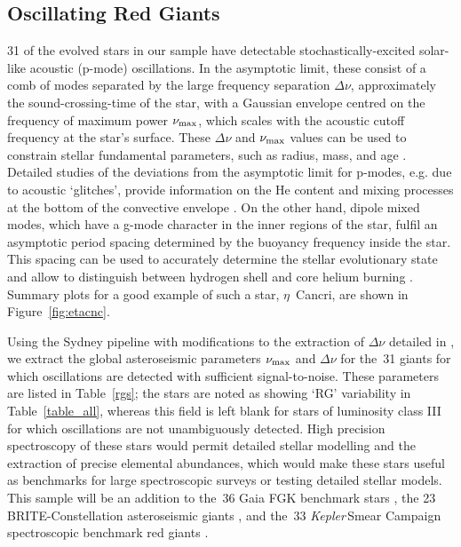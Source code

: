 \documentclass[modern]{aastex62}
\newcommand{\numax}{\mbox{$\nu_{\rm max}$}\xspace}
\newcommand{\Dnu}{\mbox{$\Delta \nu$}\xspace}
\newcommand\kepler{\emph{Kepler}\,}
\begin{document}
\subsection{Oscillating Red Giants}
\label{sec:rgs}
31 of the evolved stars in our sample have detectable stochastically-excited solar-like acoustic (p-mode) oscillations. In the asymptotic limit, these consist of a comb of modes separated by the large frequency separation \Dnu, approximately the sound-crossing-time of the star, with a Gaussian envelope centred on the frequency of maximum power \numax, which scales with the acoustic cutoff frequency at the star's surface. 
These \Dnu and \numax values can be used to constrain stellar fundamental parameters, such as radius, mass, and age \citep[e.g.][for a recent review]{2017A&ARv..25....1H}. Detailed studies of the deviations from the asymptotic limit for p-modes, e.g. due to acoustic `glitches', provide information on the He content and mixing processes at the bottom of the convective envelope \citep[e.g. ][]{Verma2019}. On the other hand, dipole mixed modes, which have a g-mode character in the inner regions of the star, fulfil an asymptotic period spacing determined by the buoyancy frequency inside the star. This spacing can be used to accurately determine the stellar evolutionary state and allow to distinguish between hydrogen shell and core helium burning \citep{bedding2011}. 
Summary plots for a good example of such a star, $\eta$~Cancri, are shown in Figure~\ref{fig:etacnc}.

Using the Sydney pipeline \citep{Huber2009} with modifications to the extraction of \Dnu detailed in \citet{Yu2018}, we extract the global asteroseismic parameters \numax and \Dnu for the~31 giants for which oscillations are detected with sufficient signal-to-noise. These parameters are listed in Table~\ref{rgs}; the stars are noted as showing `RG' variability in Table~\ref{table_all}, whereas this field is left blank for stars of luminosity class III for which oscillations are not unambiguously detected. High precision spectroscopy of these stars would permit detailed stellar modelling and the extraction of precise elemental abundances, which would make these stars useful as benchmarks for large spectroscopic surveys or testing detailed stellar models. This sample will be an addition to the~36 Gaia FGK benchmark stars \citep{gaiabenchmark1,gaiabenchmark3,2018RNAAS...2c.152J}, the 23 BRITE-Constellation asteroseismic giants \citep{Kallinger2019}, and the~33 \kepler Smear Campaign spectroscopic benchmark red giants \citep{smearcampaign}. 
\end{document}
